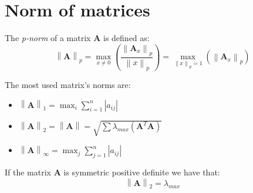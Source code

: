 \documentclass[12pt, a4paper]{report}
\begin{document}
    \section{Norm of matrices}
    \begin{definition}
        The \emph{p-norm} of a matrix $\boldsymbol{A}$ is defined as: 
        \[\left\lVert \boldsymbol{A} \right\rVert_p=\max_{x \neq 0}{\left( \dfrac{\left\lVert \boldsymbol{A}_x \right\rVert_p}{\left\lVert x \right\rVert_p} \right)}=
        \max_{\left\lVert x \right\rVert_p=1}{\left( \left\lVert \boldsymbol{A}_x \right\rVert_p \right)}\]
    \end{definition}
    The most used matrix's norms are: 
    \begin{itemize}
        \item $\left\lVert \boldsymbol{A} \right\rVert_1=\max_{i}{\sum_{i=1}^{n}{\left\lvert a_{ij} \right\rvert}}$
        \item $\left\lVert \boldsymbol{A} \right\rVert_2=\left\lVert \boldsymbol{A} \right\rVert=\sqrt{\sum{\lambda_{max}{\left( \boldsymbol{A}^T\boldsymbol{A} \right)}}}$
        \item $\left\lVert \boldsymbol{A} \right\rVert_{\infty}=\max_{j}{\sum_{j=1}^{n}{\left\lvert a_{ij} \right\rvert}}$
    \end{itemize}
    \begin{proposition}
        If the matrix $\boldsymbol{A}$ is symmetric positive definite we have that: 
        \[\left\lVert \boldsymbol{A} \right\rVert_2=\lambda_{max}\]
    \end{proposition}

    
\end{document}
